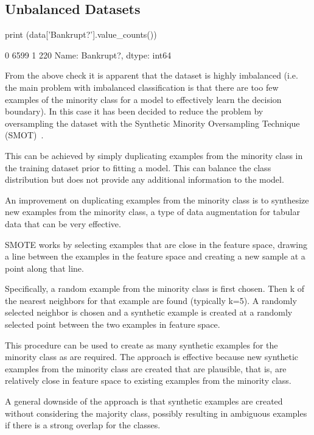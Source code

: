 \subsection{Unbalanced Datasets}

\begin{ipython}
print (data['Bankrupt?'].value_counts())
\end{ipython}
\begin{ioutput}
0    6599
1     220
Name: Bankrupt?, dtype: int64
\end{ioutput}

From the above check it is apparent that the dataset is highly imbalanced (i.e. the main problem with imbalanced classification is that there are too few examples of the minority class for a model to effectively learn the decision boundary). In this case it has been decided to reduce the problem by oversampling the dataset with the Synthetic Minority Oversampling Technique (SMOT)~\cite{bib:smot}. 

\begin{attention}
This can be achieved by simply duplicating examples from the minority class in the training dataset prior to fitting a model. This can balance the class distribution but does not provide any additional information to the model.

An improvement on duplicating examples from the minority class is to synthesize new examples from the minority class, a type of data augmentation for tabular data that can be very effective.

SMOTE works by selecting examples that are close in the feature space, drawing a line between the examples in the feature space and creating a new sample at a point along that line.

Specifically, a random example from the minority class is first chosen. Then k of the nearest neighbors for that example are found (typically k=5). A randomly selected neighbor is chosen and a synthetic example is created at a randomly selected point between the two examples in feature space.
\end{attention}

This procedure can be used to create as many synthetic examples for the minority class as are required. 
The approach is effective because new synthetic examples from the minority class are created that are plausible, that is, are relatively close in feature space to existing examples from the minority class.

A general downside of the approach is that synthetic examples are created without considering the majority class, possibly resulting in ambiguous examples if there is a strong overlap for the classes.

